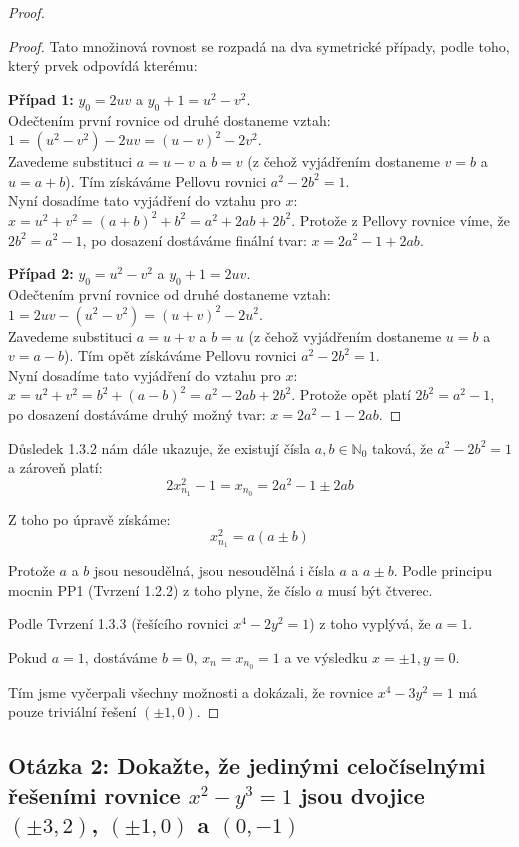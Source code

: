 \documentclass[a4paper,12pt]{article}
\begin{document}
\begin{proof}
\begin{proof}
Tato množinová rovnost se rozpadá na dva symetrické případy, podle toho, který prvek odpovídá kterému:

\textbf{Případ 1:} $y_0 = 2uv$ a $y_0 + 1 = u^2 - v^2$. \\
Odečtením první rovnice od druhé dostaneme vztah: $1 = (u^2 - v^2) - 2uv = (u - v)^2 - 2v^2$. \\
Zavedeme substituci $a = u - v$ a $b = v$ (z čehož vyjádřením dostaneme $v = b$ a $u = a + b$). Tím získáváme Pellovu rovnici $a^2 - 2b^2 = 1$. \\
Nyní dosadíme tato vyjádření do vztahu pro $x$: $x = u^2 + v^2 = (a + b)^2 + b^2 = a^2 + 2ab + 2b^2$. Protože z Pellovy rovnice víme, že $2b^2 = a^2 - 1$, po dosazení dostáváme finální tvar: $x = 2a^2 - 1 + 2ab$.

\textbf{Případ 2:} $y_0 = u^2 - v^2$ a $y_0 + 1 = 2uv$. \\
Odečtením první rovnice od druhé dostaneme vztah: $1 = 2uv - (u^2 - v^2) = (u + v)^2 - 2u^2$. \\
Zavedeme substituci $a = u + v$ a $b = u$ (z čehož vyjádřením dostaneme $u = b$ a $v = a - b$). Tím opět získáváme Pellovu rovnici $a^2 - 2b^2 = 1$. \\
Nyní dosadíme tato vyjádření do vztahu pro $x$: $x = u^2 + v^2 = b^2 + (a - b)^2 = a^2 - 2ab + 2b^2$. Protože opět platí $2b^2 = a^2 - 1$, po dosazení dostáváme druhý možný tvar: $x = 2a^2 - 1 - 2ab$.
\end{proof}

Důsledek 1.3.2 nám dále ukazuje, že existují čísla $a, b \in \mathbb{N}_0$ taková, že $a^2 - 2b^2 = 1$ a zároveň platí:
$$2x_{n_1}^2 - 1 = x_{n_0} = 2a^2 - 1 \pm 2ab$$

Z toho po úpravě získáme:
$$x_{n_1}^2 = a(a \pm b)$$

Protože $a$ a $b$ jsou nesoudělná, jsou nesoudělná i čísla $a$ a $a \pm b$. Podle principu mocnin PP1 (Tvrzení 1.2.2) z toho plyne, že číslo $a$ musí být čtverec. 

Podle Tvrzení 1.3.3 (řešícího rovnici $x^4 - 2y^2 = 1$) z toho vyplývá, že $a = 1$. 

Pokud $a = 1$, dostáváme $b = 0$, $x_n = x_{n_0} = 1$ a ve výsledku $x = \pm 1, y = 0$.

Tím jsme vyčerpali všechny možnosti a dokázali, že rovnice $x^4 - 3y^2 = 1$ má pouze triviální řešení $(\pm 1, 0)$.
\end{proof}

\subsection*{Otázka 2: Dokažte, že jedinými celočíselnými řešeními rovnice $x^2 - y^3 = 1$ jsou dvojice $(\pm3,2)$, $(\pm1,0)$ a $(0,-1)$}
\end{document}
